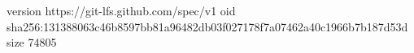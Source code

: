version https://git-lfs.github.com/spec/v1
oid sha256:131388063c46b8597bb81a96482db03f027178f7a07462a40c1966b7b187d53d
size 74805
